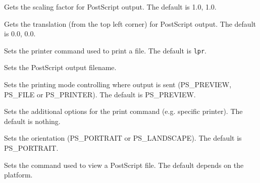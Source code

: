 
Gets the scaling factor for PostScript output. The default is 1.0, 1.0.

\label{wxgetprintertranslation}


Gets the translation (from the top left corner) for PostScript output. The default is 0.0, 0.0.

\label{wxsetprintercommand}


Sets the printer command used to print a file. The default is {\tt lpr}.

\label{wxsetprinterfile}


Sets the PostScript output filename.

\label{wxsetprintermode}


Sets the printing mode controlling where output is sent (PS\_PREVIEW, PS\_FILE or PS\_PRINTER).
The default is PS\_PREVIEW.

\label{wxsetprinteroptions}


Sets the additional options for the print command (e.g. specific printer). The default is nothing.

\label{wxsetprinterorientation}


Sets the orientation (PS\_PORTRAIT or PS\_LANDSCAPE). The default is PS\_PORTRAIT.

\label{wxsetprinterpreviewcommand}


Sets the command used to view a PostScript file. The default depends on the platform.

